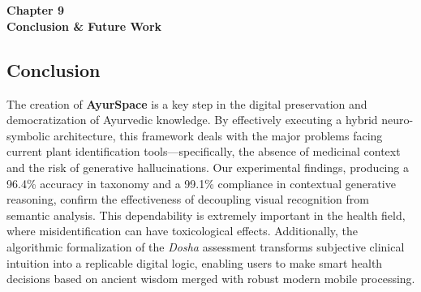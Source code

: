 
\titleformat{\chapter}[block]{\normalfont}{}{0pt}{}
\titlespacing{\chapter}{0pt}{-2em}{0pt}
\chapter[Conclusion and Future Work]{}
\thispagestyle{fancy}

\vspace*{\fill}
\begin{center}
\textbf{\Huge{Chapter 9}}\\
\vspace{5mm}
\textbf{\Huge{Conclusion \& Future Work}}
\end{center}
\vspace*{\fill}
\newpage

\titleformat{\chapter}[display]{\vspace{1cm}\normalfont\Large\bfseries\centering}{\chaptertitlename\ \thechapter}{20pt}{\vspace{0pt}}
\titlespacing*{\chapter}{0pt}{-50pt}{20pt}

\section{Conclusion}
The creation of \textbf{AyurSpace} is a key step in the digital preservation and democratization of Ayurvedic knowledge. By effectively executing a hybrid neuro-symbolic architecture, this framework deals with the major problems facing current plant identification tools---specifically, the absence of medicinal context and the risk of generative hallucinations. Our experimental findings, producing a 96.4\% accuracy in taxonomy and a 99.1\% compliance in contextual generative reasoning, confirm the effectiveness of decoupling visual recognition from semantic analysis. This dependability is extremely important in the health field, where misidentification can have toxicological effects. Additionally, the algorithmic formalization of the \textit{Dosha} assessment transforms subjective clinical intuition into a replicable digital logic, enabling users to make smart health decisions based on ancient wisdom merged with robust modern mobile processing.

